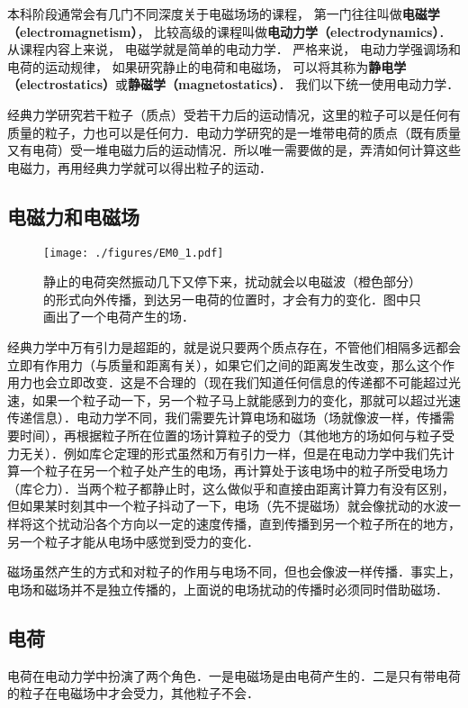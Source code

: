 

本科阶段通常会有几门不同深度关于电磁场场的课程， 第一门往往叫做\textbf{电磁学（electromagnetism）}， 比较高级的课程叫做\textbf{电动力学（electrodynamics）}． 从课程内容上来说， 电磁学就是简单的电动力学． 严格来说， 电动力学强调场和电荷的运动规律， 如果研究静止的电荷和电磁场， 可以将其称为\textbf{静电学（electrostatics）}或\textbf{静磁学（magnetostatics）}． 我们以下统一使用电动力学．

经典力学研究若干粒子（质点）受若干力后的运动情况，这里的粒子可以是任何有质量的粒子，力也可以是任何力．电动力学研究的是一堆带电荷的质点（既有质量又有电荷）受一堆电磁力后的运动情况．所以唯一需要做的是，弄清如何计算这些电磁力，再用经典力学就可以得出粒子的运动．

\subsection{电磁力和电磁场}

\begin{figure}[ht]
\centering
\texttt{[image: ./figures/EM0\_1.pdf]}
\caption{静止的电荷突然振动几下又停下来，扰动就会以电磁波（橙色部分）的形式向外传播，到达另一电荷的位置时，才会有力的变化．图中只画出了一个电荷产生的场．} \label{EM0_fig1}
\end{figure}

经典力学中万有引力是超距的，就是说只要两个质点存在，不管他们相隔多远都会立即有作用力（与质量和距离有关），如果它们之间的距离发生改变，那么这个作用力也会立即改变．这是不合理的（现在我们知道任何信息的传递都不可能超过光速，如果一个粒子动一下，另一个粒子马上就能感到力的变化，那就可以超过光速传递信息）．电动力学不同，我们需要先计算电场和磁场（场就像波一样，传播需要时间），再根据粒子所在位置的场计算粒子的受力（其他地方的场如何与粒子受力无关）．例如库仑定理的形式虽然和万有引力一样，但是在电动力学中我们先计算一个粒子在另一个粒子处产生的电场，再计算处于该电场中的粒子所受电场力（库仑力）．当两个粒子都静止时，这么做似乎和直接由距离计算力有没有区别，但如果某时刻其中一个粒子抖动了一下，电场（先不提磁场）就会像扰动的水波一样将这个扰动沿各个方向以一定的速度传播，直到传播到另一个粒子所在的地方，另一个粒子才能从电场中感觉到受力的变化．

磁场虽然产生的方式和对粒子的作用与电场不同，但也会像波一样传播．事实上，电场和磁场并不是独立传播的，上面说的电场扰动的传播时必须同时借助磁场．

\subsection{电荷}
电荷在电动力学中扮演了两个角色．一是电磁场是由电荷产生的．二是只有带电荷的粒子在电磁场中才会受力，其他粒子不会．

